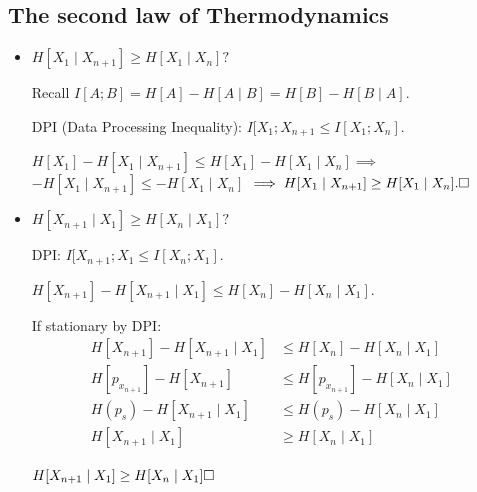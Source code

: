 \subsection{The second law of Thermodynamics}
\begin{itemize}
    \item $H[X_1\mid X_{n+1}] \geq H[X_1\mid X_n]?$

    Recall $I[A; B] = H[A] - H[A\mid B] = H[B] - H[B\mid A]$.
    
    DPI (Data Processing Inequality): $I[X_1; X_{n+1} \leq I[X_1; X_n].$
    
    $H[X_1] - H[X_1 \mid X_{n+1}]\leq
    H[X_1]  - H[X_1 \mid X_{n}]
    \implies
    $ 
    $ - H[X_1 \mid X_{n+1}]\leq
      - H[X_1 \mid X_{n}]
    $ 
    $  
    \implies
    H[X_1 \mid X_{n+1}]\geq
       H[X_1 \mid X_{n}]
       .
       \hfill\square
    $ 

    \item $H[X_{n+1}\mid X_1] \geq H[X_n\mid X_1]?$

    DPI: $I[X_{n+1}; X_{1} \leq I[X_n; X_1]$.
    
    $H[X_{n+1}] - H[X_{n+1} \mid X_{1}]
    \leq
    H[X_{n}] - H[X_{n} \mid X_{1}]
       .
    $ 

    If stationary by DPI: 
    \begin{align*}
        H[X_{n+1}] - H[X_{n+1} \mid X_1] &\leq H[X_n] - H[X_n \mid X_1] \\
        H[p_{x_{n+1}}] - H[X_{n+1}] &\leq H[p_{x_{n+1}}] - H[X_n \mid X_1] \\
        H(p_s) - H[X_{n+1} \mid X_1] &\leq H(p_s) - H[X_n \mid X_1] \\ 
        H[X_{n+1} \mid X_1] &\geq H[X_n \mid X_1]
    \end{align*}

    $H[X_{n+1}\mid X_1]
    \geq
    H[X_{n}\mid X_1]
    \hfill\square$
    
\end{itemize}



